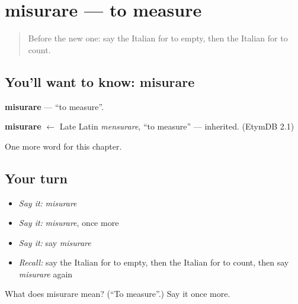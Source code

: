 \section[misurare]{misurare — to measure}

\label{lesson:IT-C206-misurare}



\begin{quote}
Before the new one: say the Italian for to empty, then the Italian for to count.
\end{quote}

\subsection*{You'll want to know: misurare}
\textbf{misurare} — \textquotedblleft{}to measure\textquotedblright{}.

\begin{cousinweb}
\textbf{misurare} $\leftarrow$ Late Latin \emph{mensurare}, \textquotedblleft{}to measure\textquotedblright{} — inherited. (EtymDB 2.1)
\end{cousinweb}

\begin{grammarlens}[title={What you've built}]
One more word for this chapter.
\end{grammarlens}

\subsection*{Your turn}
\begin{itemize}
\raggedright
  \item \emph{Say it:} \emph{misurare}
  \item \emph{Say it:} \emph{misurare}, once more
  \item \emph{Say it:} say \emph{misurare}
  \item \emph{Recall:} say the Italian for to empty, then the Italian for to count, then say \emph{misurare} again
\end{itemize}

\begin{tcolorbox}[breakable,colback=teal!4,colframe=teal!35!black,title={Before you move on}]
What does misurare mean? (\textquotedblleft{}To measure\textquotedblright{}.) Say it once more.
\end{tcolorbox}
